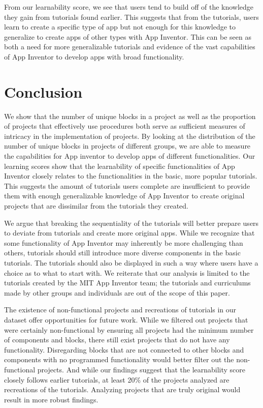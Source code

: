 \documentclass[conference]{IEEEtran}
\begin{document}
From our learnability score, we see that users tend to build off of the knowledge they gain from tutorials found earlier. This suggests that from the tutorials, users learn to create a specific type of app but not enough for this knowledge to generalize to create apps of other types with App Inventor. This can be seen as both a need for more generalizable tutorials and evidence of the vast capabilities of App Inventor to develop apps with broad functionality.




\section{Conclusion}
We show that the number of unique blocks in a project as well as the proportion of projects that effectively use procedures both serve as sufficient measures of intricacy in the implementation of projects. By looking at the distribution of the number of unique blocks in projects of different groups, we are able to measure the capabilities for App inventor to develop apps of different functionalities. Our learning scores show that the learnability of specific functionalities of App Inventor closely relates to the functionalities in the basic, more popular tutorials. This suggests the amount of tutorials users complete are insufficient to provide them with enough generalizable knowledge of App Inventor to create original projects that are dissimilar from the tutorials they created.

We argue that breaking the sequentiality of the tutorials will better prepare users to deviate from tutorials and create more original apps. While we recognize that some functionality of App Inventor may inherently be more challenging than others, tutorials should still introduce more diverse components in the basic tutorials. The tutorials should also be displayed in such a way where users have a choice as to what to start with. We reiterate that our analysis is limited to the tutorials created by the MIT App Inventor team; the tutorials and curriculums made by other groups and individuals are out of the scope of this paper.

The existence of non-functional projects and recreations of tutorials in our dataset offer opportunities for future work. While we filtered out projects that were certainly non-functional by ensuring all projects had the minimum number of components and blocks, there still exist projects that do not have any functionality. Disregarding blocks that are not connected to other blocks and components with no programmed functionality would better filter out the non-functional projects. And while our findings suggest that the learnability score closely follows earlier tutorials, at least 20\% of the projects analyzed are recreations of the tutorials. Analyzing projects that are truly original would result in more robust findings. 
\end{document}

